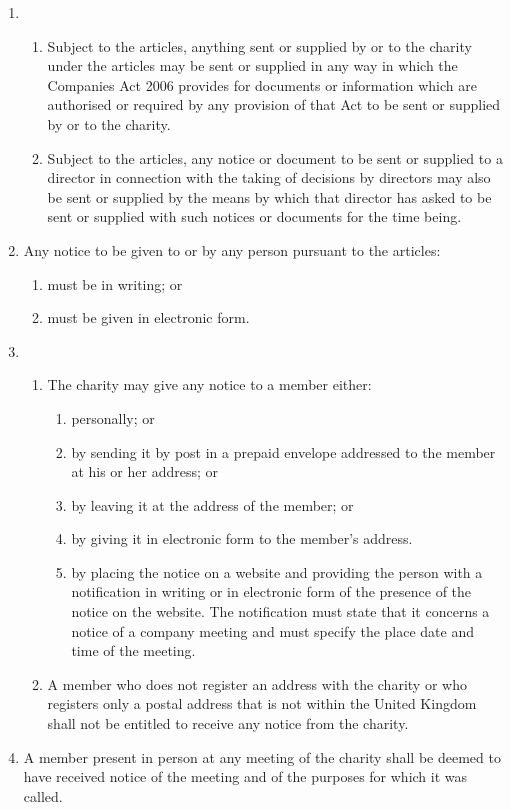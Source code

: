 \begin{enumerate}
\item
  \begin{enumerate}
  \item
    Subject to the articles, anything sent or supplied by or to the
    charity under the articles may be sent or supplied in any way in
    which the Companies Act 2006 provides for documents or information
    which are authorised or required by any provision of that Act to be
    sent or supplied by or to the charity.
  \item
    Subject to the articles, any notice or document to be sent or
    supplied to a director in connection with the taking of decisions
    by directors may also be sent or supplied by the means by which
    that director has asked to be sent or supplied with such notices or
    documents for the time being.
  \end{enumerate}
\item
  Any notice to be given to or by any person pursuant to the
  articles:
  \begin{enumerate}
  \item
    must be in writing; or
  \item
    must be given in electronic form.
  \end{enumerate}

\item
  \begin{enumerate}
  \item
    The charity may give any notice to a member either:
    \begin{enumerate}
    \item
      personally; or
    \item
      by sending it by post in a prepaid envelope addressed to the member
      at his or her address; or
    \item
      by leaving it at the address of the member; or
    \item
      by giving it in electronic form to the member's address.
    \item
      by placing the notice on a website and providing the person with a
      notification in writing or in electronic form of the presence of
      the notice on the website. The notification must state that it
      concerns a notice of a company meeting and must specify the place
      date and time of the meeting.
    \end{enumerate}
  \item
    A member who does not register an address with the charity or who
    registers only a postal address that is not within the United
    Kingdom shall not be entitled to receive any notice from the
    charity.
  \end{enumerate}
\item
  A member present in person at any meeting of the charity shall be
  deemed to have received notice of the meeting and of the purposes
  for which it was called.


\end{enumerate}
